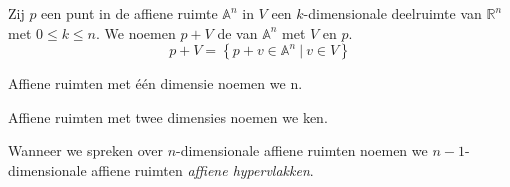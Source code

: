 \documentclass[main.tex]{subfiles}
\begin{document}
\begin{de}
  \label{de:affiene-deelruimte}
  Zij $p$ een punt in de affiene ruimte $\mathbb{A}^{n}$ in $V$ een $k$-dimensionale deelruimte van $\mathbb{R}^{n}$ met $0 \le k \le n$.
  We noemen $p + V$ de  van $\mathbb{A}^{n}$ met  $V$ en  $p$.
  \[ p + V = \left\{ p + v \in \mathbb{A}^{n}\ |\ v \in V \right\} \]
\end{de}

\begin{de}
  Affiene ruimten met \'e\'en dimensie noemen we n.
\end{de}

\begin{de}
  Affiene ruimten met twee dimensies noemen we ken.
\end{de}

\begin{de}
  Wanneer we spreken over $n$-dimensionale affiene ruimten noemen we $n-1$-dimensionale affiene ruimten \emph{affiene hypervlakken}.
\end{de}
\end{document}
